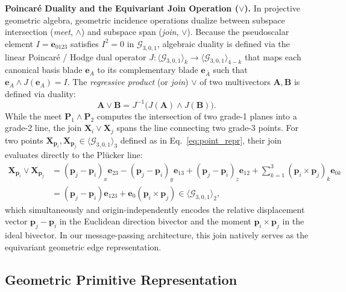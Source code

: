 \documentclass[10pt]{article}
\begin{document}
\noindent\textbf{Poincaré Duality and the Equivariant Join Operation ($\vee$).}
In projective geometric algebra, geometric incidence operations dualize between subspace intersection (\emph{meet}, $\wedge$) and subspace span (\emph{join}, $\vee$). Because the pseudoscalar element $I = \mathbf{e}_{0123}$ satisfies $I^2 = 0$ in $\mathcal{G}_{3,0,1}$, algebraic duality is defined via the linear Poincaré / Hodge dual operator $J: \langle \mathcal{G}_{3,0,1} \rangle_k \to \langle \mathcal{G}_{3,0,1} \rangle_{4-k}$ that maps each canonical basis blade $\mathbf{e}_A$ to its complementary blade $\mathbf{e}_{\bar{A}}$ such that $\mathbf{e}_A \wedge J(\mathbf{e}_A) = I$. 
The \emph{regressive product} (or \emph{join}) $\vee$ of two multivectors $\mathbf{A}, \mathbf{B}$ is defined via duality:
\begin{equation}
    \mathbf{A} \vee \mathbf{B} = J^{-1}\big( J(\mathbf{A}) \wedge J(\mathbf{B}) \big).
    \label{eq:join_def}
\end{equation}
While the meet $\mathbf{P}_1 \wedge \mathbf{P}_2$ computes the intersection of two grade-1 planes into a grade-2 line, the join $\mathbf{X}_i \vee \mathbf{X}_j$ spans the line connecting two grade-3 points. For two points $\mathbf{X}_{\mathbf{p}_i}, \mathbf{X}_{\mathbf{p}_j} \in \langle \mathcal{G}_{3,0,1} \rangle_3$ defined as in Eq.~\ref{eq:point_repr}, their join evaluates directly to the Plücker line:
\begin{align}
    \mathbf{X}_{\mathbf{p}_i} \vee \mathbf{X}_{\mathbf{p}_j} 
    &= (\mathbf{p}_j - \mathbf{p}_i)_x \mathbf{e}_{23} - (\mathbf{p}_j - \mathbf{p}_i)_y \mathbf{e}_{13} + (\mathbf{p}_j - \mathbf{p}_i)_z \mathbf{e}_{12} + \sum_{k=1}^3 (\mathbf{p}_i \times \mathbf{p}_j)_k \mathbf{e}_{0k} \nonumber \\
    &= (\mathbf{p}_j - \mathbf{p}_i) \mathbf{e}_{123} + \mathbf{e}_0 (\mathbf{p}_i \times \mathbf{p}_j) \in \langle \mathcal{G}_{3,0,1} \rangle_2,
    \label{eq:join_coords}
\end{align}
which simultaneously and origin-independently encodes the relative displacement vector $\mathbf{p}_j - \mathbf{p}_i$ in the Euclidean direction bivector and the moment $\mathbf{p}_i \times \mathbf{p}_j$ in the ideal bivector. In our message-passing architecture, this join natively serves as the equivariant geometric edge representation.

\subsection{Geometric Primitive Representation}
\label{subsec:pga_primitives}
\end{document}
